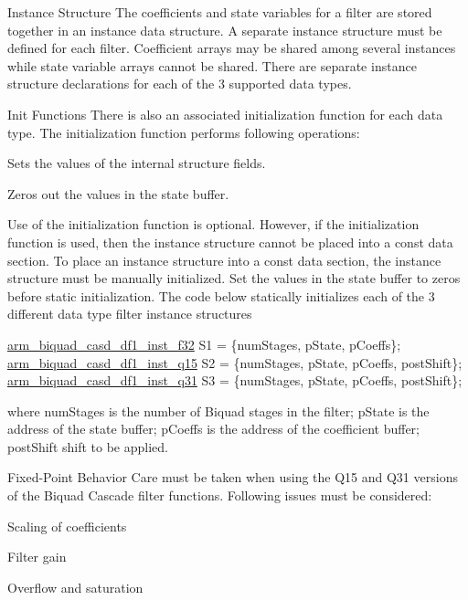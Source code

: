 \begin{DoxyParagraph}{Instance Structure }
The coefficients and state variables for a filter are stored together in an instance data structure. A separate instance structure must be defined for each filter. Coefficient arrays may be shared among several instances while state variable arrays cannot be shared. There are separate instance structure declarations for each of the 3 supported data types.
\end{DoxyParagraph}
\begin{DoxyParagraph}{Init Functions }
There is also an associated initialization function for each data type. The initialization function performs following operations\-:
\begin{DoxyItemize}
\item Sets the values of the internal structure fields.
\item Zeros out the values in the state buffer.
\end{DoxyItemize}
\end{DoxyParagraph}
\begin{DoxyParagraph}{}
Use of the initialization function is optional. However, if the initialization function is used, then the instance structure cannot be placed into a const data section. To place an instance structure into a const data section, the instance structure must be manually initialized. Set the values in the state buffer to zeros before static initialization. The code below statically initializes each of the 3 different data type filter instance structures 
\begin{DoxyPre}    
    \hyperlink{structarm__biquad__casd__df1__inst__f32}{arm\_biquad\_casd\_df1\_inst\_f32} S1 = \{numStages, pState, pCoeffs\};    
    \hyperlink{structarm__biquad__casd__df1__inst__q15}{arm\_biquad\_casd\_df1\_inst\_q15} S2 = \{numStages, pState, pCoeffs, postShift\};    
    \hyperlink{structarm__biquad__casd__df1__inst__q31}{arm\_biquad\_casd\_df1\_inst\_q31} S3 = \{numStages, pState, pCoeffs, postShift\};    
\end{DoxyPre}
 where {\ttfamily num\-Stages} is the number of Biquad stages in the filter; {\ttfamily p\-State} is the address of the state buffer; {\ttfamily p\-Coeffs} is the address of the coefficient buffer; {\ttfamily post\-Shift} shift to be applied.
\end{DoxyParagraph}
\begin{DoxyParagraph}{Fixed-\/\-Point Behavior }
Care must be taken when using the Q15 and Q31 versions of the Biquad Cascade filter functions. Following issues must be considered\-:
\begin{DoxyItemize}
\item Scaling of coefficients
\item Filter gain
\item Overflow and saturation
\end{DoxyItemize}
\end{DoxyParagraph}
